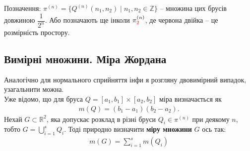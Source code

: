 \documentclass[a4paper, 10pt]{article}
\theoremstyle{theoremdd}
\theoremstyle{theoremdd}
\theoremstyle{theoremdd}
\theoremstyle{theoremdd}
\theoremstyle{theoremdd}
\theoremstyle{theoremdd}
\theoremstyle{theoremdd}
\theoremstyle{theoremdd}
\begin{document}
Позначення: $\pi^{(n)} = \{ Q^{(n)}(n_1,n_2) \mid n_1,n_2 \in \mathbb{Z}\}$ -- множина цих брусів довжиною $\dfrac{1}{2^n}$. Або позначають ще інколи $\pi^{(n)}_{\textcolor{red}{2}}$, де червона двійка -- це розмірність простору.

\subsection{Вимірні множини. Міра Жордана}
Аналогічно для нормального сприйняття інфи я розгляну двовимірний випадок, узагальнити можна.\\
Уже відомо, що для бруса $Q = [a_1,b_1] \times [a_2,b_2]$ міра визначається як
\begin{align*} 
m(Q) = (b_1-a_1)(b_2-a_2).
\end{align*}
Нехай $G \subset \mathbb{R}^2$, яка допускає розклад в різні бруси $Q_i \in \pi^{(n)}$ при деякому $n$, тобто $G = \displaystyle\bigcup_{i=1}^s Q_i$. Тоді природно визначити \textbf{міру множини} $G$ ось так:
\begin{align*}
m(G) = \sum_{i=1}^s m(Q_i)
\end{align*}
\end{document}
